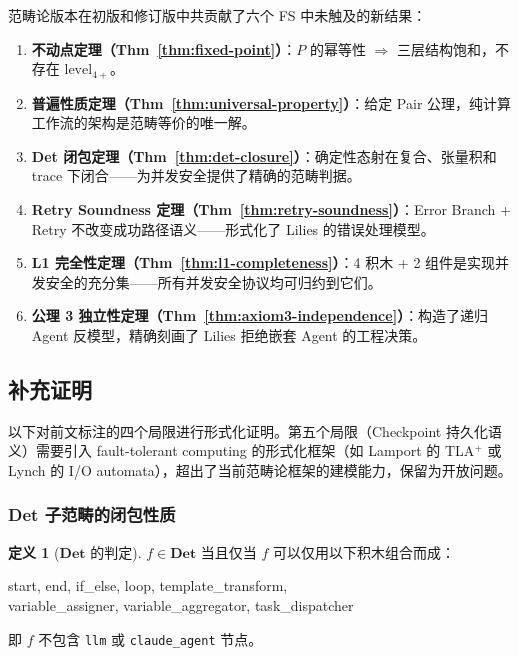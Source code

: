 \documentclass[11pt,a4paper]{article}
\theoremstyle{definition}
\theoremstyle{definition}
\newtheorem{definition}[theorem]{定义}
\theoremstyle{remark}
\newcommand{\cat}[1]{\mathbf{#1}}
\newcommand{\catDet}{\cat{Det}}
\newcommand{\pairMonad}{P}
\begin{document}
范畴论版本在初版和修订版中共贡献了六个 FS 中未触及的新结果：
\begin{enumerate}[leftmargin=2em,label=(\arabic*)]
    \item \textbf{不动点定理（Thm~\ref{thm:fixed-point}）}：$\pairMonad$ 的幂等性 $\Rightarrow$ 三层结构饱和，不存在 $\mathrm{level}_{4+}$。
    \item \textbf{普遍性质定理（Thm~\ref{thm:universal-property}）}：给定 Pair 公理，纯计算工作流的架构是范畴等价的唯一解。
    \item \textbf{Det 闭包定理（Thm~\ref{thm:det-closure}）}：确定性态射在复合、张量积和 trace 下闭合——为并发安全提供了精确的范畴判据。
    \item \textbf{Retry Soundness 定理（Thm~\ref{thm:retry-soundness}）}：Error Branch + Retry 不改变成功路径语义——形式化了 Lilies 的错误处理模型。
    \item \textbf{L1 完全性定理（Thm~\ref{thm:l1-completeness}）}：4 积木 + 2 组件是实现并发安全的充分集——所有并发安全协议均可归约到它们。
    \item \textbf{公理 3 独立性定理（Thm~\ref{thm:axiom3-independence}）}：构造了递归 Agent 反模型，精确刻画了 Lilies 拒绝嵌套 Agent 的工程决策。
\end{enumerate}

\subsection{补充证明}

以下对前文标注的四个局限进行形式化证明。第五个局限（Checkpoint 持久化语义）需要引入 fault-tolerant computing 的形式化框架（如 Lamport 的 TLA$^{+}$ 或 Lynch 的 I/O automata），超出了当前范畴论框架的建模能力，保留为开放问题。

\subsubsection{Det 子范畴的闭包性质}

\begin{definition}[$\catDet$ 的判定]
$f \in \catDet$ 当且仅当 $f$ 可以仅用以下积木组合而成：
\begin{center}
\small\ttfamily
start, end, if\_else, loop, template\_transform,\\
variable\_assigner, variable\_aggregator, task\_dispatcher
\end{center}
即 $f$ 不包含 \texttt{llm} 或 \texttt{claude\_agent} 节点。
\end{definition}
\end{document}
